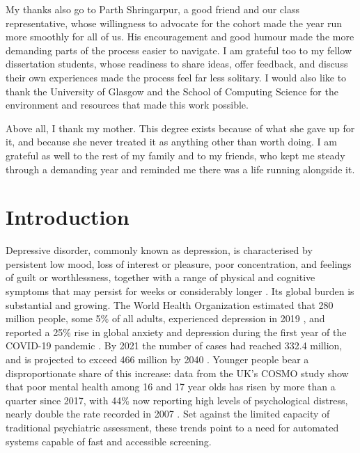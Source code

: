 \documentclass{mproj}
\begin{document}
My thanks also go to Parth Shringarpur, a good friend and our class representative, whose willingness to advocate for the cohort made the year run more smoothly for all of us. His encouragement and good humour made the more demanding parts of the process easier to navigate. I am grateful too to my fellow dissertation students, whose readiness to share ideas, offer feedback, and discuss their own experiences made the process feel far less solitary. I would also like to thank the University of Glasgow and the School of Computing Science for the environment and resources that made this work possible.

Above all, I thank my mother. This degree exists because of what she gave up for it, and because she never treated it as anything other than worth doing. I am grateful as well to the rest of my family and to my friends, who kept me steady through a demanding year and reminded me there was a life running alongside it.

\tableofcontents

\chapter{Introduction}\label{intro}

Depressive disorder, commonly known as depression, is characterised by persistent low mood, loss of interest or pleasure, poor concentration, and feelings of guilt or worthlessness, together with a range of physical and cognitive symptoms that may persist for weeks or considerably longer \cite{who2026depression}. Its global burden is substantial and growing. The World Health Organization estimated that 280 million people, some 5\% of all adults, experienced depression in 2019 \cite{who2026depression}, and reported a 25\% rise in global anxiety and depression during the first year of the COVID-19 pandemic \cite{who2022covid}. By 2021 the number of cases had reached 332.4 million, and is projected to exceed 466 million by 2040 \cite{zhang2026burden}. Younger people bear a disproportionate share of this increase: data from the UK's COSMO study show that poor mental health among 16 and 17 year olds has risen by more than a quarter since 2017, with 44\% now reporting high levels of psychological distress, nearly double the rate recorded in 2007 \cite{cosmo2025}. Set against the limited capacity of traditional psychiatric assessment, these trends point to a need for automated systems capable of fast and accessible screening.
\end{document}
